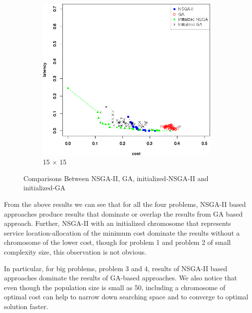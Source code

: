 \documentclass{llncs}
\begin{document}
\begin{flushleft}
\begin{flushleft}
\begin{figure}[H]
\begin{subfigure}[b]{0.4\textwidth}
	\end{subfigure}
	\begin{subfigure}[b]{0.4\textwidth}
		\includegraphics[width=\textwidth]{pics/pop_50_gen_50_15_times_15_sufficient_initialisation.png}
		\caption{15 $\times$ 15}
	\end{subfigure}
	\caption{Comparisons Between NSGA-II, GA, initialized-NSGA-II and initialized-GA}\label{fig:c1}
\end{figure}

From the above results we can see that for all the four problems, NSGA-II based approaches produce results that dominate or overlap the results from GA based approach. Further,
NSGA-II with an initialized chromosome that represents service location-allocation of the minimum cost dominate the results without a chromosome of the lower cost, though for problem 1 and
problem 2 of small complexity size, this observation is not obvious.

In particular, for big problems, problem 3 and 4, results of NSGA-II based approaches dominate the results of GA-based approaches. We also notice that even though the population size
is small as 50, including a chromosome of optimal cost can help to narrow down searching space and to converge to optimal solution faster.


\end{flushleft}
\end{flushleft}
\end{document}
